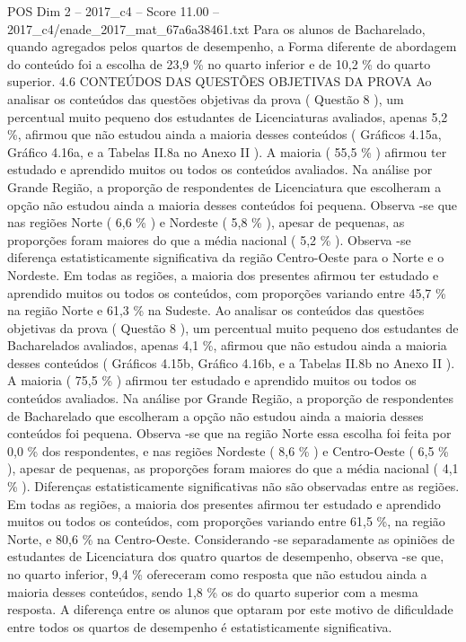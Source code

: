\begin{textsample}{POS Dim 2 – 2017\_c4 – Score 11.00 – 2017\_c4/enade\_2017\_mat\_67a6a38461.txt}
Para os alunos de Bacharelado, quando agregados pelos quartos de desempenho, a Forma diferente de abordagem do conteúdo foi a escolha de 23,9 \% no quarto inferior e de 10,2 \% do quarto superior. 4.6 CONTEÚDOS DAS QUESTÕES OBJETIVAS DA PROVA Ao analisar os conteúdos das questões objetivas da prova ( Questão 8 ), um percentual muito pequeno dos estudantes de Licenciaturas avaliados, apenas 5,2 \%, afirmou que não estudou ainda a maioria desses conteúdos ( Gráficos 4.15a, Gráfico 4.16a, e a Tabelas II.8a no Anexo II ).
A maioria ( 55,5 \% ) afirmou ter estudado e aprendido muitos ou todos os conteúdos avaliados.
Na análise por Grande Região, a proporção de respondentes de Licenciatura que escolheram a opção não estudou ainda a maioria desses conteúdos foi pequena.
Observa -se que nas regiões Norte ( 6,6 \% ) e Nordeste ( 5,8 \% ), apesar de pequenas, as proporções foram maiores do que a média nacional ( 5,2 \% ).
Observa -se diferença estatisticamente significativa da região Centro-Oeste para o Norte e o Nordeste.
Em todas as regiões, a maioria dos presentes afirmou ter estudado e aprendido muitos ou todos os conteúdos, com proporções variando entre 45,7 \% na região Norte e 61,3 \% na Sudeste.
Ao analisar os conteúdos das questões objetivas da prova ( Questão 8 ), um percentual muito pequeno dos estudantes de Bacharelados avaliados, apenas 4,1 \%, afirmou que não estudou ainda a maioria desses conteúdos ( Gráficos 4.15b, Gráfico 4.16b, e a Tabelas II.8b no Anexo II ).
A maioria ( 75,5 \% ) afirmou ter estudado e aprendido muitos ou todos os conteúdos avaliados.
Na análise por Grande Região, a proporção de respondentes de Bacharelado que escolheram a opção não estudou ainda a maioria desses conteúdos foi pequena.
Observa -se que na região Norte essa escolha foi feita por 0,0 \% dos respondentes, e nas regiões Nordeste ( 8,6 \% ) e Centro-Oeste ( 6,5 \% ), apesar de pequenas, as proporções foram maiores do que a média nacional ( 4,1 \% ).
Diferenças estatisticamente significativas não são observadas entre as regiões.
Em todas as regiões, a maioria dos presentes afirmou ter estudado e aprendido muitos ou todos os conteúdos, com proporções variando entre 61,5 \%, na região Norte, e 80,6 \% na Centro-Oeste.
Considerando -se separadamente as opiniões de estudantes de Licenciatura dos quatro quartos de desempenho, observa -se que, no quarto inferior, 9,4 \% ofereceram como resposta que não estudou ainda a maioria desses conteúdos, sendo 1,8 \% os do quarto superior com a mesma resposta.
A diferença entre os alunos que optaram por este motivo de dificuldade entre todos os quartos de desempenho é estatisticamente significativa.

\end{textsample}

